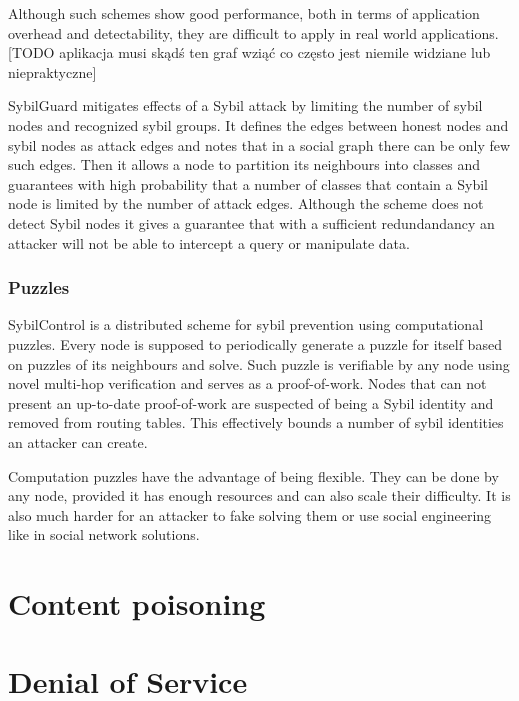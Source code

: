   Although such schemes show good performance, both in terms of application
  overhead and detectability, they are difficult to apply in real world
  applications.  [TODO aplikacja musi skądś ten graf wziąć co często jest
  niemile widziane lub niepraktyczne]

  SybilGuard \cite{hai06} mitigates effects of a Sybil attack by limiting the
  number of sybil nodes and recognized sybil groups. It defines the edges
  between honest nodes and sybil nodes as attack edges and notes that in a
  social graph there can be only few such edges. Then it allows a node to
  partition its neighbours into classes and guarantees with high probability
  that a number of classes that contain a Sybil node is limited by the number of
  attack edges. Although the scheme does not detect Sybil nodes it gives a
  guarantee that with a sufficient redundandancy an attacker will not be able to
  intercept a query or manipulate data.

  \subsubsection{Puzzles}
  SybilControl\cite{li12} is a distributed scheme for sybil prevention using
  computational puzzles. Every node is supposed to periodically generate a
  puzzle for itself based on puzzles of its neighbours and solve. Such puzzle
  is verifiable by any node using novel multi-hop verification and serves as a
  proof-of-work. Nodes that can not present an up-to-date proof-of-work are
  suspected of being a Sybil identity and removed from routing tables. This
  effectively bounds a number of sybil identities an attacker can create.

  Computation puzzles have the advantage of being flexible. They can be done by
  any node, provided it has enough resources and can also scale their
  difficulty. It is also much harder for an attacker to fake solving them or use
  social engineering like in social network solutions.

\section{Content poisoning}

\section{Denial of Service}
